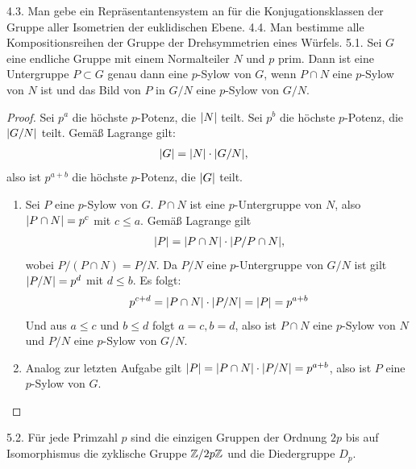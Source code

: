 \documentclass{article}
\newcommand{\ex}[1]{\tit{Übung} #1.}
\begin{document}
		\newpar
		\ex{4.3} Man gebe ein Repräsentantensystem an für die Konjugationsklassen der Gruppe aller Isometrien der euklidischen Ebene.
		\newpar
		\ex{4.4} Man bestimme alle Kompositionsreihen der Gruppe der Drehsymmetrien eines Würfels.
		\newpar
		\ex{5.1} Sei $G$ eine endliche Gruppe mit einem Normalteiler $N$ und $p$ prim. Dann ist eine Untergruppe $P \subset G$ genau dann eine $p$-Sylow von $G$, wenn $P \cap N$ eine $p$-Sylow von $N$ ist und das Bild von $P$ in $G/N$ eine $p$-Sylow von $G/N$.
		\begin{proof}\phantom{}
			Sei $p^a$ die höchste $p$-Potenz, die $\abs{N}$ teilt. Sei $p^b$ die höchste $p$-Potenz, die $\abs{G/N}$ teilt. Gemäß Lagrange gilt:
			\begin{align*}
				\abs{G}
				&= \abs{N} \cdot \abs{G/N},
			\end{align*}
			also ist $p^{a+b}$ die höchste $p$-Potenz, die $\abs{G}$ teilt.
			\begin{enumerate}
				\item Sei $P$ eine $p$-Sylow von $G$. $P \cap N$ ist eine $p$-Untergruppe von $N$, also $\abs{P \cap N} = p^c$ mit $c \leq a$. Gemäß Lagrange gilt
				\begin{align*}
					\abs{P} = \abs{P \cap N} \cdot \abs{P / P \cap N},
				\end{align*}
				wobei $P/(P \cap N) = P/N$.
				Da $P/N$ eine $p$-Untergruppe von $G/N$ ist gilt $\abs{P/N} = p^d$ mit $d \leq b$. Es folgt:
				\begin{align*}
					p^{c+d} = \abs{P \cap N} \cdot \abs{P/N} = \abs{P} = p^{a + b}
				\end{align*}
				Und aus $a \leq c$ und $b \leq d$ folgt $a = c, b = d$, also ist $P \cap N$ eine $p$-Sylow von $N$ und $P/N$ eine $p$-Sylow von $G/N$.
				\item Analog zur letzten Aufgabe gilt $\abs{P} = \abs{P \cap N} \cdot \abs{P/N} = p^{a+b}$, also ist $P$ eine $p$-Sylow von $G$.
			\end{enumerate}
		\end{proof}
		\newpar
		\ex{5.2} Für jede Primzahl $p$ sind die einzigen Gruppen der Ordnung $2p$ bis auf Isomorphismus die zyklische Gruppe $\mathbb{Z}/2p\mathbb{Z}$ und die Diedergruppe $D_p$.
\end{document}
